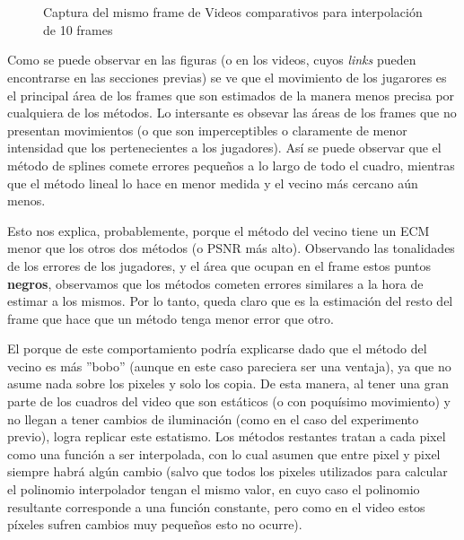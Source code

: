 \begin{figure}[H]
    \centering
    \\
    \\
    \caption{Captura del mismo frame de Videos comparativos para interpolaci\'on de 10 frames}
    \label{fig:fija-movil_heatmap}
\end{figure}

\par Como se puede observar en las figuras (o en los videos, cuyos \emph{links}
pueden encontrarse en las secciones previas) se ve que el movimiento de los
jugarores es el principal \'area de los frames que son estimados de la manera
menos precisa por cualquiera de los m\'etodos. Lo intersante es obsevar las
\'areas de los frames que no presentan movimientos (o que son imperceptibles o
claramente de menor intensidad que los pertenecientes a los jugadores). As\'i
se puede observar que el m\'etodo de splines comete errores peque\~nos a lo largo
de todo el cuadro, mientras que el m\'etodo lineal lo hace en menor medida y el
vecino m\'as cercano a\'un menos.

\par Esto nos explica, probablemente, porque el m\'etodo del vecino tiene un
ECM menor que los otros dos m\'etodos (o PSNR m\'as alto). Observando las tonalidades
de los errores de los jugadores, y el \'area que ocupan en el frame estos puntos
\textbf{negros}, observamos que los m\'etodos cometen errores similares a la hora
de estimar a los mismos. Por lo tanto, queda claro que es la estimaci\'on del
resto del frame que hace que un m\'etodo tenga menor error que otro.

\par El porque de este comportamiento podr\'ia explicarse dado que el m\'etodo
del vecino es m\'as ''bobo'' (aunque en este caso pareciera ser una ventaja), ya
que no asume nada sobre los pixeles y solo los copia. De esta manera, al tener
una gran parte de los cuadros del video que son est\'aticos (o con poqu\'isimo
movimiento) y no llegan a tener cambios de iluminaci\'on (como en el caso del
experimento previo), logra replicar este estatismo. Los m\'etodos restantes
tratan a cada pixel como una funci\'on a ser interpolada, con lo cual asumen
que entre pixel y pixel siempre habr\'a alg\'un cambio (salvo que todos los
pixeles utilizados para calcular el polinomio interpolador tengan el mismo valor,
en cuyo caso el polinomio resultante corresponde a una funci\'on constante, pero
como en el video estos p\'ixeles sufren cambios muy peque\~nos esto no ocurre).


